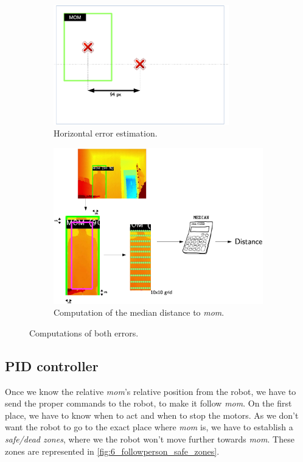 		\begin{figure}[h]
			\centering
				\begin{subfigure}[b]{0.4\linewidth}
				\centering
				\includegraphics[width=3in]{images/h_error}
				\caption{Horizontal error estimation.}
				\label{fig:6_h_error}
			\end{subfigure}
			\hfill
			\begin{subfigure}[b]{0.5\linewidth}
				\centering
				\includegraphics[width=3.7in]{images/distance_error}
				\caption{Computation of the median distance to \emph{mom}.}
				\label{fig:6_distance_to_mom}
			\end{subfigure}

			\caption{Computations of both errors.}
			\label{fig:6_errors}
		\end{figure}

	
	
	
	\subsection{PID controller}
		Once we know the relative \emph{mom}'s relative position from the robot, we have to send the proper commands to the robot, to make it follow \emph{mom}. On the first place, we have to know when to act and when to stop the motors. As we don't want the robot to go to the exact place where \emph{mom} is, we have to establish a \emph{safe/dead zones}, where we the robot won't move further towards \emph{mom}. These zones are represented in \autoref{fig:6_followperson_safe_zones}.\\
		

